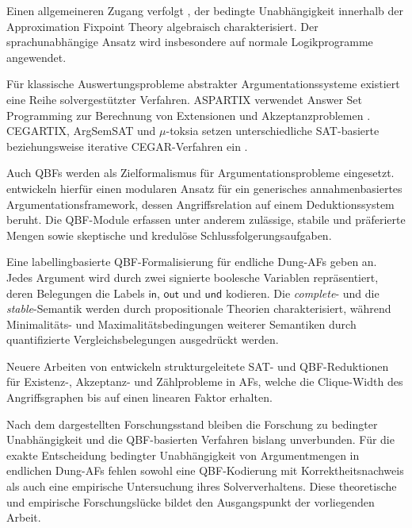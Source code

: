 Einen allgemeineren Zugang verfolgt
\textcite{heyninck:2025:algebraic-ci}, der bedingte Unabhängigkeit
innerhalb der Approximation Fixpoint Theory algebraisch charakterisiert.
Der sprachunabhängige Ansatz wird insbesondere auf normale
Logikprogramme angewendet.

Für klassische Auswertungsprobleme abstrakter Argumentationssysteme
existiert eine Reihe solvergestützter Verfahren. ASPARTIX verwendet
Answer Set Programming zur Berechnung von Extensionen und
Akzeptanzproblemen \cite{egly:gaggl:woltran:2010:aspartix}. CEGARTIX,
ArgSemSAT und \(\mu\)-toksia setzen unterschiedliche SAT-basierte
beziehungsweise iterative CEGAR-Verfahren ein
\cite{dvorak:etal:2014:cegartix,
cerutti:giacomin:vallati:2019:argsemsat,
niskanen:jarvisalo:2020:mu-toksia}.

Auch QBFs werden als Zielformalismus für Argumentationsprobleme
eingesetzt. \textcite{egly:woltran:2006:reasoning-qbf} entwickeln
hierfür einen modularen Ansatz für ein generisches annahmenbasiertes
Argumentationsframework, dessen Angriffsrelation auf einem
Deduktionssystem beruht. Die QBF-Module erfassen unter anderem
zulässige, stabile und präferierte Mengen sowie skeptische und
kredulöse Schlussfolgerungsaufgaben.

Eine labellingbasierte QBF-Formalisierung für endliche Dung-AFs geben
\textcite{arieli:caminada:2013:qbf-af} an. Jedes Argument wird durch
zwei signierte boolesche Variablen repräsentiert, deren Belegungen die
Labels \(\mathsf{in}\), \(\mathsf{out}\) und \(\mathsf{und}\)
kodieren. Die \emph{complete}- und die \emph{stable}-Semantik werden
durch propositionale Theorien charakterisiert, während
Minimalitäts- und Maximalitätsbedingungen weiterer Semantiken durch
quantifizierte Vergleichsbelegungen ausgedrückt werden.

Neuere Arbeiten von
\textcite{mahmood:etal:2026:cliquewidth} entwickeln strukturgeleitete
SAT- und QBF-Reduktionen für Existenz-, Akzeptanz- und Zählprobleme in
AFs, welche die Clique-Width des Angriffsgraphen bis auf einen linearen
Faktor erhalten.

Nach dem dargestellten Forschungsstand bleiben die Forschung zu
bedingter Unabhängigkeit und die QBF-basierten Verfahren bislang
unverbunden. Für die exakte Entscheidung bedingter Unabhängigkeit von
Argumentmengen in endlichen Dung-AFs fehlen sowohl eine QBF-Kodierung
mit Korrektheitsnachweis als auch eine empirische Untersuchung ihres
Solververhaltens. Diese theoretische und empirische Forschungslücke
bildet den Ausgangspunkt der vorliegenden Arbeit.


